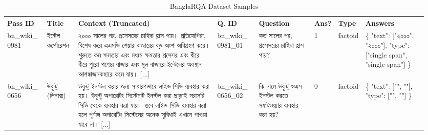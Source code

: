 \documentclass[manuscript,screen,review]{acmart}
\newcommand{\bn}[1]{{\bengalifont #1}}
\begin{document}
\begin{table}[ht!]
    \centering
    \caption{BanglaRQA Dataset Samples}
    \label{tab:banglarqa_samples}
    \small %
    \setlength\tabcolsep{3pt} %
    \renewcommand{\arraystretch}{1.2} %
    
    \begin{tabularx}{\textwidth}{
        >{\raggedright\arraybackslash\scriptsize}p{1.2cm}   %
        >{\raggedright\arraybackslash\scriptsize}p{1.5cm}   %
        >{\scriptsize}X                                      %
        >{\raggedright\arraybackslash\scriptsize}p{1.2cm}   %
        >{\raggedright\arraybackslash\scriptsize}p{2.2cm}   %
        >{\centering\arraybackslash\scriptsize}p{0.6cm}     %
        >{\raggedright\arraybackslash\scriptsize}p{1.0cm}   %
        >{\raggedright\arraybackslash\tiny}p{3.0cm}         %
    }
        \toprule
        \textbf{Pass ID} & \textbf{Title} & \textbf{Context (Truncated)} & \textbf{Q. ID} & \textbf{Question} & \textbf{Ans?} & \textbf{Type} & \textbf{Answers} \\
        \midrule
        
        bn\_wiki\_ 0981 
        & \bn{ইন্টেল কর্পোরেশন} 
        & \bn{২০০০ সালের পর, প্রসেসরের চাহিদা হ্রাস পায়। প্রতিযোগিরা, বিশেষ করে এএমডি শেয়ার বাজারের বড় অংশ অধিগ্রহণ করে। শুরুতে কম ক্ষমতার এবং মধ্যম ক্ষমতার প্রসেসর এবং ধীরে ধীরে পুরো পণ্যের বাজার এবং মূল বাজারে ইন্টেলের অবস্থান আশঙ্কাজনকহারে কমে যায়। [...]} 
        & bn\_wiki\_ 0981\_01 
        & \bn{কত সালের পর, প্রসেসরের চাহিদা হ্রাস পায়?} 
        & 1 
        & factoid 
        & \ttfamily \{ "text": ["\bn{২০০০}", "\bn{২০০০}"], "type": ["single span", "single span"] \} \\
        \midrule
        
        bn\_wiki\_ 0656 
        & \bn{উবুন্টু (লিনাক্স)} 
        & \bn{উবুন্টু ইনস্টল করার জন্য সাধারণভাবে লাইভ সিডি ব্যবহার করা হয়। উবুন্টু অপারেটিং সিস্টেমটি ইনস্টল করা ছাড়াই সরাসরি সিডি থেকে ব্যবহার করা যায়। তবে লাইভ সিডি ব্যবহার করা হলে পূর্ণাঙ্গ অপারেটিং সিস্টেমের অনেক সুবিধাই এখানে পাওয়া যাবে না। [...]} 
        & bn\_wiki\_ 0656\_02 
        & \bn{কি নামে উবুন্টু ওএস ইনস্টল করতে সফটওয়্যার ব্যবহার করা হয়?} 
        & 0 
        & factoid 
        & \ttfamily \{ "text": ["", ""], "type": ["", ""] \} \\

        \bottomrule
    \end{tabularx}
\end{table}
\end{document}
